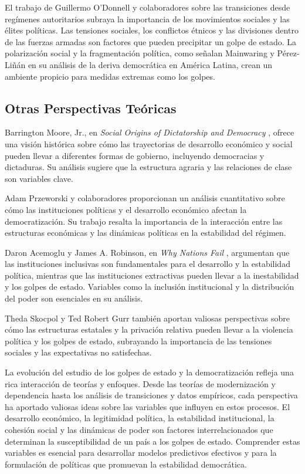 \documentclass{article}
\begin{document}
El trabajo de Guillermo O'Donnell y colaboradores \cite{o1986transitions} sobre las 
transiciones desde regímenes autoritarios subraya la importancia de los movimientos 
sociales y las élites políticas. Las tensiones sociales, los conflictos étnicos y 
las divisiones dentro de las fuerzas armadas son factores que pueden precipitar un 
golpe de estado. La polarización social y la fragmentación política, como señalan 
Mainwaring y Pérez-Liñán \cite{mainwaring2015democracia} en su análisis de la 
deriva democrática en América Latina, crean un ambiente propicio para medidas 
extremas como los golpes.

\subsection{Otras Perspectivas Teóricas}

Barrington Moore, Jr., en \textit{Social Origins of Dictatorship and Democracy} 
\cite{moore1966social}, ofrece una visión histórica sobre cómo las trayectorias de 
desarrollo económico y social pueden llevar a diferentes formas de gobierno, 
incluyendo democracias y dictaduras. Su análisis sugiere que la estructura agraria y 
las relaciones de clase son variables clave.

Adam Przeworski y colaboradores \cite{przeworski2000democracy} proporcionan un 
análisis cuantitativo sobre cómo las instituciones políticas y el desarrollo 
económico afectan la democratización. Su trabajo resalta la importancia de la 
interacción entre las estructuras económicas y las dinámicas políticas en la 
estabilidad del régimen.

Daron Acemoglu y James A. Robinson, en \textit{Why Nations Fail} \cite{acemoglu2012why}, 
argumentan que las instituciones inclusivas son fundamentales para el desarrollo y la 
estabilidad política, mientras que las instituciones extractivas pueden llevar a la 
inestabilidad y los golpes de estado. Variables como la inclusión institucional y la 
distribución del poder son esenciales en su análisis.

Theda Skocpol \cite{skocpol1979states} y Ted Robert Gurr \cite{gurr1970why} también 
aportan valiosas perspectivas sobre cómo las estructuras estatales y la privación 
relativa pueden llevar a la violencia política y los golpes de estado, subrayando la 
importancia de las tensiones sociales y las expectativas no satisfechas.

La evolución del estudio de los golpes de estado y la democratización refleja una 
rica interacción de teorías y enfoques. Desde las teorías de modernización y 
dependencia hasta los análisis de transiciones y datos empíricos, cada perspectiva 
ha aportado valiosas ideas sobre las variables que influyen en estos procesos. El 
desarrollo económico, la legitimidad política, la estabilidad institucional, la 
cohesión social y las dinámicas de poder son factores interrelacionados que 
determinan la susceptibilidad de un país a los golpes de estado. Comprender estas 
variables es esencial para desarrollar modelos predictivos efectivos y para la 
formulación de políticas que promuevan la estabilidad democrática.
\end{document}
